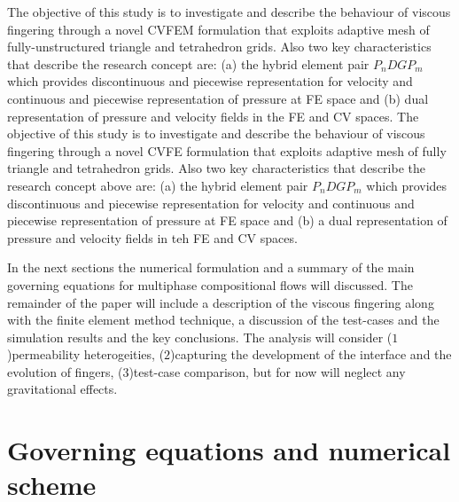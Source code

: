 \documentclass[preprint,authoryear,12pt]{elsarticle}
\begin{document}
\medskip
The objective of this study is to investigate and describe the behaviour of viscous fingering through a novel CVFEM formulation that exploits adaptive mesh of fully-unstructured triangle and tetrahedron grids. Also two key characteristics that describe the research concept are: (a) the hybrid element pair $P_{n}DGP_{m}$ which provides discontinuous and piecewise representation for velocity and continuous and piecewise representation of pressure at FE space and (b) dual representation of pressure and velocity fields in the FE and CV spaces.
The objective of this study is to investigate and describe the behaviour of viscous fingering through a novel CVFE formulation that exploits adaptive mesh of fully triangle and tetrahedron grids. Also two key characteristics that describe the research concept above are: (a) the hybrid element pair $P_{n}DGP_{m}$ which provides discontinuous and piecewise representation for velocity and continuous and piecewise representation of pressure at FE space and (b) a dual representation of pressure and velocity fields in teh FE and CV spaces.

\medskip
In the next sections the numerical formulation and a summary of the main governing equations for multiphase compositional flows will discussed. The remainder of the paper will include a description of the viscous fingering along with the finite element method technique, a discussion of the test-cases and the simulation results and the key conclusions. The analysis will consider ($1$)permeability heterogeities, ($2$)capturing the development of the interface and the evolution of fingers, ($3$)test-case comparison, but for now will neglect any gravitational effects.


\section{Governing equations and numerical scheme}\label{equations_scheme}      
\end{document}
